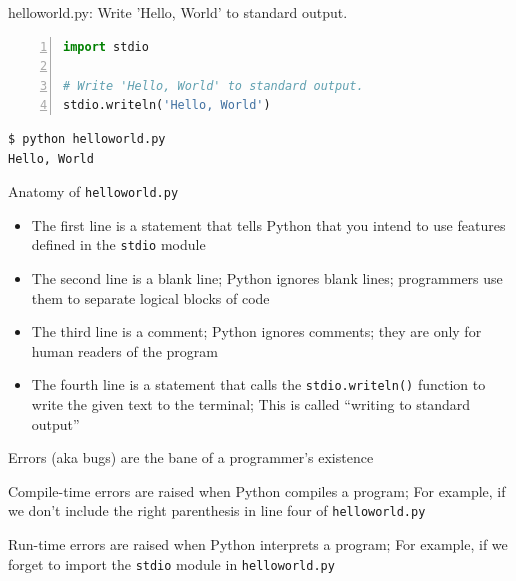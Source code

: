 \documentclass[8pt,a4paper,compress]{beamer}
\begin{document}
\begin{frame}[fragile]
\pause

\begin{framed}
\tiny helloworld.py: Write 'Hello, World' to standard output.
\end{framed}

\begin{lstlisting}[language=Python,numbers=left]
import stdio

# Write 'Hello, World' to standard output.
stdio.writeln('Hello, World')
\end{lstlisting}

\pause

\begin{lstlisting}[language={}]
$ python helloworld.py 
Hello, World
\end{lstlisting}

\pause
\bigskip

Anatomy of \lstinline{helloworld.py}
\begin{itemize}
\item The first line is a statement that tells Python that you intend to use features defined in the \lstinline{stdio} module
 
\item The second line is a blank line; Python ignores blank lines; programmers use them to separate logical blocks of code

\item The third line is a comment; Python ignores comments; they are only for human readers of the program

\item The fourth line is a statement that calls the \lstinline{stdio.writeln()} function to write the given text to the terminal; This is called ``writing to standard output''
\end{itemize}
\end{frame}

\begin{frame}[fragile]
\pause

Errors (aka bugs) are the bane of a programmer's existence

\pause
\bigskip

Compile-time errors are raised when Python compiles a program; For example, if we don't include the right parenthesis in line four of \lstinline{helloworld.py}

\pause
\bigskip

Run-time errors are raised when Python interprets a program; For example, if we forget to import the \lstinline{stdio} module in \lstinline{helloworld.py}
\end{frame}
\end{document}
